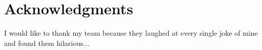 \chapter*{Acknowledgments}
\label{cha:acknowledgments}

I would like to thank my team because they laughed at every single joke of mine and found them hilarious...

